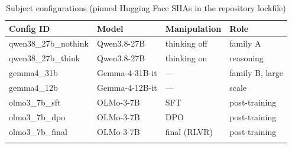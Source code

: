 \begin{table}[t]
\centering
\caption{Subject configurations (pinned Hugging Face SHAs in the repository lockfile)}
\label{tab:models}
\begin{tabular}{llll}
\toprule
Config ID & Model & Manipulation & Role \\
\midrule
qwen38\_27b\_nothink & Qwen3.8-27B & thinking off & family A \\
qwen38\_27b\_think & Qwen3.8-27B & thinking on & reasoning \\
gemma4\_31b & Gemma-4-31B-it & --- & family B, large \\
gemma4\_12b & Gemma-4-12B-it & --- & scale \\
olmo3\_7b\_sft & OLMo-3-7B & SFT & post-training \\
olmo3\_7b\_dpo & OLMo-3-7B & DPO & post-training \\
olmo3\_7b\_final & OLMo-3-7B & final (RLVR) & post-training \\
\botrule
\end{tabular}
\end{table}
